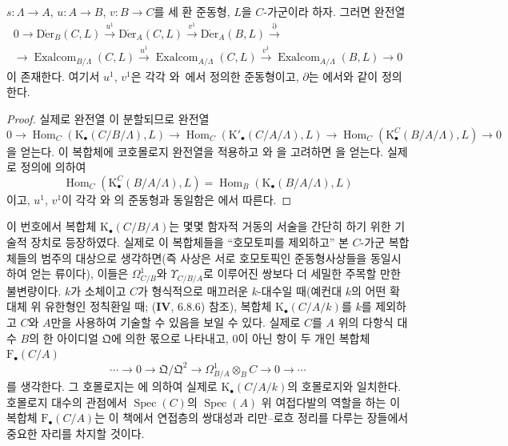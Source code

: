 \begin{proposition}[20.6.25]
\label{0.20.6.25-ko}
$s:\Lambda\to A$, $u:A\to B$, $v:B\to C$를 세 환 준동형,
$L$을 $C$-가군이라 하자. 그러면 완전열
\begin{equation}
\tag{20.6.25.1}
\label{0.20.6.25.1-ko}
\begin{split}
  0\to\operatorname{D\acute{e}r}_B(C,L)\xrightarrow{u^1}
  \operatorname{D\acute{e}r}_A(C,L)\xrightarrow{v^1}
  \operatorname{D\acute{e}r}_A(B,L)\xrightarrow{\partial} \\
  \to\operatorname{Exalcom}_{B/\Lambda}(C,L)\xrightarrow{u^1}
  \operatorname{Exalcom}_{A/\Lambda}(C,L)\xrightarrow{v^1}
  \operatorname{Exalcom}_{A/\Lambda}(B,L)\to0
\end{split}
\end{equation}
이 존재한다. 여기서 $u^1$, $v^1$은 각각
와 \,에서 정의한
준동형이고, $\partial$는 에서와 같이 정의한다.
\end{proposition}

\begin{proof}
실제로 완전열 이 분할되므로 완전열
\[
  0\to\operatorname{Hom}_C(\mathrm{K}_\bullet(C/B/\Lambda),L)\to
  \operatorname{Hom}_C(\mathrm{K}'_\bullet(C/A/\Lambda),L)\to
  \operatorname{Hom}_C(\mathrm{K}^C_\bullet(B/A/\Lambda),L)\to0
\]
을 얻는다. 이 복합체에 코호몰로지 완전열을 적용하고
와 을 고려하면
을 얻는다. 실제로 정의에 의하여
\[
  \operatorname{Hom}_C(\mathrm{K}^C_\bullet(B/A/\Lambda),L)
  =\operatorname{Hom}_B(\mathrm{K}_\bullet(B/A/\Lambda),L)
\]
이고, $u^1$, $v^1$이 각각 와
의 준동형과 동일함은
에서 따른다.
\end{proof}

\begin{remark}[20.6.26]
\label{0.20.6.26-ko}
이 번호에서 복합체 $\mathrm{K}_\bullet(C/B/A)$는 몇몇 함자적 거동의
서술을 간단히 하기 위한 기술적 장치로 등장하였다. 실제로 이 복합체들을
``호모토피를 제외하고'' 본 $C$-가군 복합체들의 범주의
대상으로 생각하면(즉 사상은 서로 호모토픽인 준동형사상들을 동일시하여
얻는 류이다), 이들은 $\Omega^1_{C/B}$와 $\Upsilon_{C/B/A}$로 이루어진
쌍보다 더 세밀한 주목할 만한 불변량이다. $k$가 소체이고 $C$가
형식적으로 매끄러운 $k$-대수일 때(예컨대 $k$의 어떤 확대체 위 유한형인
정칙환일 때; ($\mathbf{IV}$, 6.8.6) 참조), 복합체
$\mathrm{K}_\bullet(C/A/k)$를 $k$를 제외하고 $C$와 $A$만을 사용하여
기술할 수 있음을 보일 수 있다. 실제로 $C$를 $A$ 위의 다항식 대수
$B$의 한 아이디얼 $\mathfrak Q$에 의한 몫으로 나타내고, 0이 아닌 항이
두 개인 복합체 $\mathrm{F}_\bullet(C/A)$
\[
  \cdots\to0\to\mathfrak Q/\mathfrak Q^2\to
  \Omega^1_{B/A}\otimes_B C\to0\to\cdots
\]
를 생각한다. 그 호몰로지는 에 의하여 실제로
$\mathrm{K}_\bullet(C/A/k)$의 호몰로지와 일치한다. 호몰로지 대수의
관점에서 $\operatorname{Spec}(C)$의 $\operatorname{Spec}(A)$ 위
여접다발의 역할을 하는 이 복합체 $\mathrm{F}_\bullet(C/A)$는 이 책에서
연접층의 쌍대성과 리만--로흐 정리를 다루는 장들에서 중요한 자리를
차지할 것이다.
\end{remark}

